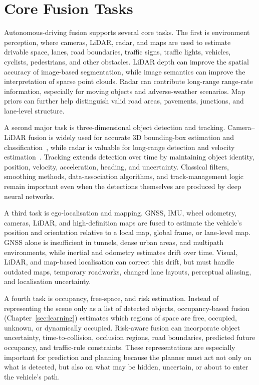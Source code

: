 \section{Core Fusion Tasks}

Autonomous-driving fusion supports several core tasks. The first is environment perception, where cameras, LiDAR, radar, and maps are used to estimate drivable space, lanes, road boundaries, traffic signs, traffic lights, vehicles, cyclists, pedestrians, and other obstacles. LiDAR depth can improve the spatial accuracy of image-based segmentation, while image semantics can improve the interpretation of sparse point clouds. Radar can contribute long-range range-rate information, especially for moving objects and adverse-weather scenarios. Map priors can further help distinguish valid road areas, pavements, junctions, and lane-level structure.

A second major task is three-dimensional object detection and tracking. Camera--LiDAR fusion is widely used for accurate 3D bounding-box estimation and classification~\cite{bai2022_transfusion,liu2023_bevfusion}, while radar is valuable for long-range detection and velocity estimation~\cite{nabati2021_centerfusion,kim2023_crn}. Tracking extends detection over time by maintaining object identity, position, velocity, acceleration, heading, and uncertainty. Classical filters, smoothing methods, data-association algorithms, and track-management logic remain important even when the detections themselves are produced by deep neural networks.

A third task is ego-localisation and mapping. GNSS, IMU, wheel odometry, cameras, LiDAR, and high-definition maps are fused to estimate the vehicle's position and orientation relative to a local map, global frame, or lane-level map. GNSS alone is insufficient in tunnels, dense urban areas, and multipath environments, while inertial and odometry estimates drift over time. Visual, LiDAR, and map-based localisation can correct this drift, but must handle outdated maps, temporary roadworks, changed lane layouts, perceptual aliasing, and localisation uncertainty.

A fourth task is occupancy, free-space, and risk estimation. Instead of representing the scene only as a list of detected objects, occupancy-based fusion (Chapter~\ref{sec:learning}) estimates which regions of space are free, occupied, unknown, or dynamically occupied. Risk-aware fusion can incorporate object uncertainty, time-to-collision, occlusion regions, road boundaries, predicted future occupancy, and traffic-rule constraints. These representations are especially important for prediction and planning because the planner must act not only on what is detected, but also on what may be hidden, uncertain, or about to enter the vehicle's path.

